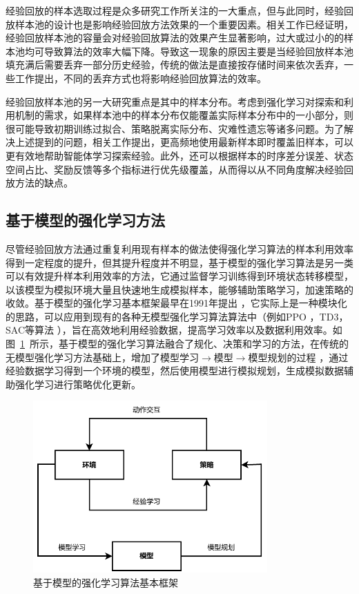 经验回放的样本选取过程是众多研究工作所关注的一大重点，但与此同时，经验回放样本池的设计也是影响经验回放方法效果的一个重要因素。相关工作已经证明，经验回放样本池的容量会对经验回放算法的效果产生显著影响，过大或过小的的样本池均可导致算法的效率大幅下降\cite{zhang2017deeper}。导致这一现象的原因主要是当经验回放样本池填充满后需要丢弃一部分历史经验，传统的做法是直接按存储时间来依次丢弃，一些工作提出，不同的丢弃方式也将影响经验回放算法的效率\cite{pieters2016q}。

经验回放样本池的另一大研究重点是其中的样本分布。考虑到强化学习对探索和利用机制的需求，如果样本池中的样本分布仅能覆盖实际样本分布中的一小部分，则很可能导致初期训练过拟合、策略脱离实际分布、灾难性遗忘等诸多问题。为了解决上述提到的问题，相关工作提出，更高频地使用最新样本即时覆盖旧样本，可以更有效地帮助智能体学习探索经验\cite{de2015importance}。此外，还可以根据样本的时序差分误差、状态空间占比、奖励反馈等多个指标进行优先级覆盖，从而得以从不同角度解决经验回放方法的缺点。

\subsection{基于模型的强化学习方法}

尽管经验回放方法通过重复利用现有样本的做法使得强化学习算法的样本利用效率得到一定程度的提升，但其提升程度并不明显，基于模型的强化学习算法是另一类可以有效提升样本利用效率的方法，它通过监督学习训练得到环境状态转移模型，以该模型为模拟环境大量且快速地生成模拟样本，能够辅助策略学习，加速策略的收敛。基于模型的强化学习基本框架最早在1991年提出 \cite{Sutton1991DynaReacting}，它实际上是一种模块化的思路，可以应用到现有的各种无模型强化学习算法算法中（例如PPO ，TD3，SAC等算法 \cite{schulman2017proximal,haarnoja2018soft}），旨在高效地利用经验数据，提高学习效率以及数据利用效率。如图~\ref{fig:dyna-structure}~所示，基于模型的强化学习算法融合了规化、决策和学习的方法，在传统的无模型强化学习方法基础上，增加了模型学习$\longrightarrow$模型$\longrightarrow$模型规划的过程 \cite{lin1992self}，通过经验数据学习得到一个环境的模型，然后使用模型进行模拟规划，生成模拟数据辅助强化学习进行策略优化更新。

\begin{figure}[tbh]
\centering
\includegraphics[width=0.8\textwidth]{figures/MBRL-struc.pdf}
\caption{基于模型的强化学习算法基本框架}
\label{fig:dyna-structure}
\end{figure}

